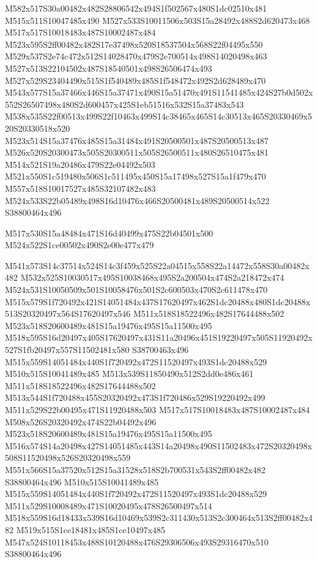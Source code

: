 \documentclass{article}
\begin{document}
\begin{multicols}{2}
M582x517S30a00482x482S28806542x494S1f502567x480S1dc02510x481 M515x511S10047485x490 M527x533S10011506x503S15a28492x488S2d620473x468 M517x517S10018483x487S10002487x484 M523x595S2ff00482x482S17e37498x520S18537504x568S22f04495x550 M529x537S2e74c472x512S14028470x479S2e700514x498S14020498x463 M527x513S22104502x487S18540501x498S26506474x493 M527x529S23404490x515S1f540489x485S1f548472x492S2d628489x470 M543x577S15a37466x446S15a37471x490S15a51470x491S11541485x424S27b0d502x552S26507498x480S2d600457x425S1eb51516x532S15a37483x543 M538x535S22f00513x499S22f10463x499S14c38465x465S14c30513x465S20330469x520S20330518x520 M523x514S15a37476x485S15a31484x491S20500501x487S20500513x487 M526x520S20300473x505S20300511x505S26500511x480S26510475x481 M514x521S19a20486x479S22e04492x503 M521x550S1c519480x506S1c511495x450S15a17498x527S15a1f479x470 M557x518S10017527x485S32107482x483 M524x533S22b05489x498S16d10476x466S20500481x489S20500514x522 S38800464x496

\begin{center}
M517x530S15a48484x471S16d40499x475S22b04501x500 M524x522S1ce00502x490S2e00e477x479 
\end{center}


M541x573S14c37514x524S14c3f459x525S22a04515x558S22a14472x558S30a00482x482 M532x525S10030517x495S10038468x495S2a200504x474S2a218472x474 M524x531S10050509x501S10058476x501S2c600503x470S2c611478x470 M515x579S1f720492x421S14051484x437S17620497x462S1dc20488x480S1dc20488x513S20320497x564S17620497x546 M511x518S18522496x482S17644488x502 M523x518S20600489x481S15a19476x495S15a11500x495 M518x595S16d20497x405S17620497x431S11a20496x451S19220497x505S11920492x527S1fb20497x557S11502481x580 S38700463x496 M515x559S14051484x440S1f720492x472S11520497x493S1dc20488x529 M510x515S10041489x485 M513x539S11850490x512S2dd0e486x461 M511x518S18522496x482S17644488x502 M513x544S1f720488x455S20320492x473S1f720486x529S19220492x499 M511x529S22b00495x471S11920488x503 M517x517S10018483x487S10002487x484 M508x526S20320492x474S22b04492x496 M523x518S20600489x481S15a19476x495S15a11500x495 M516x574S14a20498x427S14051485x443S14a20498x490S11502483x472S20320498x508S11520498x526S20320498x559 M551x566S15a37520x512S15a31528x518S2b700531x543S2ff00482x482 S38800464x496 M510x515S10041489x485 M515x559S14051484x440S1f720492x472S11520497x493S1dc20488x529 M511x529S10008489x471S10020495x478S26500497x514 M518x559S16d18433x539S16d10469x539S2c311430x513S2c300464x513S2ff00482x482 M519x515S1ce18481x485S1ce10497x485 M547x524S10118453x488S10120488x476S29306506x493S29316470x510 S38800464x496


\end{multicols}
\end{document}
